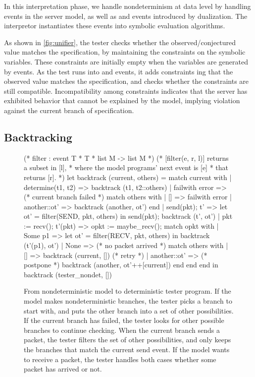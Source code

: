 In this interpretation phase, we handle nondeterminism at data level by handling
 events in the server model, as well as  and 
events introduced by dualization.  The interpretor instantiates these events
into symbolic evaluation algorithms.

As shown in \autoref{fig:unifier}, the tester checks whether the observed/conjectured
value matches the specification, by maintaining the constraints on the symbolic
variables.  These constraints are initially empty when the variables are
generated by  events.  As the test runs into  and
 events, it adds constraints ing that the observed value
matches the specification, and checks whether the constraints are still
compatible.  Incompatibility among constraints indicates that the server has
exhibited behavior that cannot be explained by the model, implying violation
against the current branch of specification.

\subsection{Backtracking}
\label{sec:backtracking}
\begin{figure}
  \begin{coq}[escapechar=\%]
(* filter : event T * T * list M -> list M *)
(* [filter(e, r, l)] returns a subset in [l],
 * where the model programs' next event is [e]
 * that returns [r]. *)
let backtrack (current, others) =
  match current with
  | determine(t1, t2) =>
    backtrack (t1, t2::others)
  | failwith error => (* current branch failed *) %
    match others with
    | [] => failwith error
    | another::ot' => backtrack (another, ot')
    end %
  | send(pkt); t' =>
    let ot' = filter(SEND, pkt, others) in %
    send(pkt); backtrack (t', ot')
  | pkt := recv(); t'(pkt) =>
    opkt := maybe_recv();
    match opkt with
    | Some p1 =>
      let ot' = filter(RECV, pkt, others) in %
      backtrack (t'(p1), ot')
    | None =>             (* no packet arrived *)
      match others with
      | [] => backtrack (current, []) (* retry *)
      | another::ot' =>            (* postpone *)
        backtrack (another, ot'++[current])
      end
    end
  end in
backtrack (tester_nondet, [])
  \end{coq}
  \caption{From nondeterministic model to deterministic tester program.  If the
    model makes nondeterministic branches, the tester picks a branch to start
    with, and puts the other branch into a set of other possibilities.  If the
    current branch has failed, the tester looks for other possible branches to
    continue checking.  When the current branch sends a packet, the tester
    filters the set of other possibilities, and only keeps the branches that
    match the current send event.  If the model wants to receive a packet, the
    tester handles both cases whether some packet has arrived or not.}
  \label{fig:backtrack}
\end{figure}


